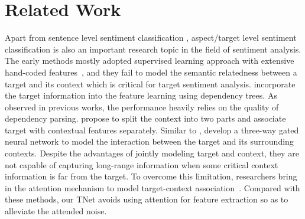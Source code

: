 \documentclass[11pt,a4paper]{article}
\begin{document}
\section{Related Work}

Apart from sentence level sentiment classification \cite{kim:2014:EMNLP2014,bei2018sentiment_embedding}, aspect/target level sentiment classification 
is also an important research topic in the field of sentiment analysis. The early methods mostly adopted supervised learning approach with extensive hand-coded features~\cite{blair2008building,titov2008modeling,yu2011aspect,jiang-EtAl:2011:ACL-HLT2011,kiritchenko-EtAl:2014:SemEval,wagner-EtAl:2014:SemEval,vo2015target}, and they fail to model the semantic relatedness between a target and its context which is critical for target sentiment analysis. \citet{dong-EtAl:2014:P14-2} incorporate the target information into the feature learning using dependency trees. As observed in previous works, the performance heavily relies on the quality of dependency parsing. \citet{tang-EtAl:2016:COLING3} propose to split the context into two parts and associate target with contextual features separately. Similar to \cite{tang-EtAl:2016:COLING3}, \citet{zhang2016gated} develop a three-way gated neural network to model the interaction between the target and its surrounding contexts. Despite the advantages of jointly modeling target and context, they are not capable of capturing long-range information when some critical context information is far from the target. To overcome this limitation, researchers bring in the attention mechanism to model target-context association~\cite{tang-EtAl:2016:COLING3,tang-qin-liu:2016:EMNLP2016,wang-EtAl:2016:EMNLP20163,yang2017attention,liu-zhang:2017:EACLshort,ma2017interactive,chen-EtAl:2017:EMNLP20171,zhang-EtAl:2017:I17-11,tay2017learning}. 
Compared with these methods, our TNet avoids using attention for feature extraction so as to alleviate the attended noise. 
\end{document}
